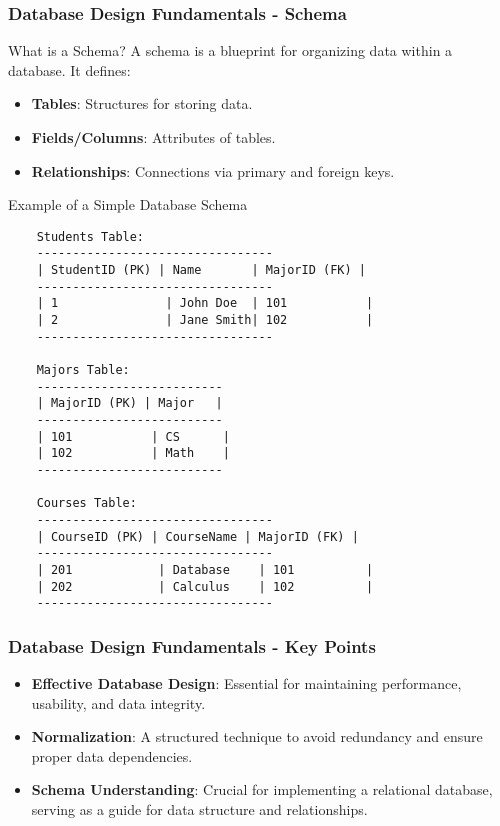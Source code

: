\documentclass[aspectratio=169]{beamer}
\begin{document}
\begin{frame}[fragile]
    \frametitle{Database Design Fundamentals - Schema}
    \begin{block}{What is a Schema?}
        A schema is a blueprint for organizing data within a database. It defines:
        \begin{itemize}
            \item \textbf{Tables}: Structures for storing data.
            \item \textbf{Fields/Columns}: Attributes of tables.
            \item \textbf{Relationships}: Connections via primary and foreign keys.
        \end{itemize}
    \end{block}
    
    \begin{block}{Example of a Simple Database Schema}
    \begin{lstlisting}
    Students Table:
    ---------------------------------
    | StudentID (PK) | Name       | MajorID (FK) |
    ---------------------------------
    | 1               | John Doe  | 101           |
    | 2               | Jane Smith| 102           |
    ---------------------------------
    
    Majors Table:
    --------------------------
    | MajorID (PK) | Major   |
    --------------------------
    | 101           | CS      |
    | 102           | Math    |
    --------------------------
    
    Courses Table:
    ---------------------------------
    | CourseID (PK) | CourseName | MajorID (FK) |
    ---------------------------------
    | 201            | Database    | 101          |
    | 202            | Calculus    | 102          |
    ---------------------------------
    \end{lstlisting}
    \end{block}
\end{frame}

\begin{frame}[fragile]
    \frametitle{Database Design Fundamentals - Key Points}
    \begin{itemize}
        \item \textbf{Effective Database Design}: Essential for maintaining performance, usability, and data integrity.
        \item \textbf{Normalization}: A structured technique to avoid redundancy and ensure proper data dependencies.
        \item \textbf{Schema Understanding}: Crucial for implementing a relational database, serving as a guide for data structure and relationships.
    \end{itemize}
\end{frame}
\end{document}
